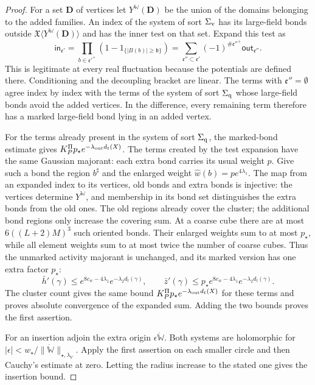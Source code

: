 \documentclass[11pt,letterpaper,reqno]{amsart}
\theoremstyle{definition}
\theoremstyle{remark}
\begin{document}
\begin{proof}
For a set $\mathbf D$ of vertices let $Y^{\mathbb W}(\mathbf D)$
be the union of the domains belonging to the added families.
An index of the system of sort $\Sigma_{\rm v}$ has its
large-field bonds outside $\mathfrak X\langle
Y^{\mathbb W}(\mathbf D)\rangle$ and has the inner test on
that set. Expand this test as
\[
 \mathsf{in}_{\mathfrak e'}=
  \prod_{b\in\mathfrak e'^+}(1-1_{\{|B(b)|\ge\mathfrak b\}})
  =\sum_{\mathfrak e''\subset\mathfrak e'}
                (-1)^{\#\mathfrak e''^+}\mathsf{out}_{\mathfrak e''}.
\]
This is legitimate at every real fluctuation because the
potentials are defined there. Conditioning and the decoupling
bracket are linear. The terms with $\mathfrak e''=\emptyset$
agree index by index with the terms of the system of sort
$\Sigma_{\rm q}$ whose large-field bonds avoid the added
vertices. In the difference, every remaining term therefore
has a marked large-field bond lying in an added vertex.

For the terms already present in the system of sort
$\Sigma_{\rm q}$, the marked-bond estimate gives
$K_P^\Pi p_\star e^{-\lambda_{\rm out}d_t(X)}$.
The terms created by the test expansion have the same Gaussian
majorant: each extra bond carries its usual weight $p$.
Give such a bond the region $b^\sharp$ and the enlarged weight
$\widehat w(b)=pe^{4\lambda_1}$. The map from an expanded
index to its vertices, old bonds and extra bonds is injective:
the vertices determine $Y^{\mathbb W}$, and membership in
its bond set distinguishes the extra bonds from the old ones.
The old regions already cover the cluster; the additional
bond regions only increase the covering sum. At a coarse cube
there are at most $6((L+2)M)^3$ such oriented bonds. Their
enlarged weights sum to at most $p_\star$, while all element
weights sum to at most twice the number of coarse cubes.
Thus the unmarked activity majorant is unchanged, and its
marked version has one extra factor $p_\star$:
\[
 \bar h'(\gamma)\le e^{8c_w-4\lambda_1}
                            e^{-\lambda_2d_t(\gamma)},\qquad
 \bar z'(\gamma)\le p_\star e^{8c_w-4\lambda_1}
                            e^{-\lambda_2d_t(\gamma)}.
\]
The cluster count gives the same bound
$K_P^\Pi p_\star e^{-\lambda_{\rm out}d_t(X)}$ for these
terms and proves absolute convergence of the expanded sum.
Adding the two bounds proves the first assertion.

For an insertion adjoin the extra origin
$\epsilon\dot{\mathbb W}$. Both systems are holomorphic for
$|\epsilon|<w_\star/\|\dot{\mathbb W}\|_{\star,\lambda_V}$.
Apply the first assertion on each smaller circle and then
Cauchy's estimate at zero. Letting the radius increase to
the stated one gives the insertion bound.
\end{proof}
\end{document}
